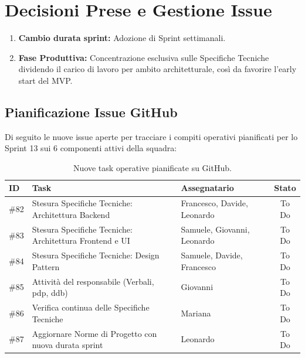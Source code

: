 \documentclass[a4paper, 11pt, oneside]{scrartcl} %
\begin{document}
\newpage
\section{Decisioni Prese e Gestione Issue}

\begin{enumerate}
    \item \textbf{Cambio durata sprint:} Adozione di Sprint settimanali.
    \item \textbf{Fase Produttiva:} Concentrazione esclusiva sulle Specifiche Tecniche dividendo il carico di lavoro per ambito architetturale, così da favorire l'early start del MVP.
\end{enumerate}

\subsection{Pianificazione Issue GitHub}
Di seguito le nuove issue aperte per tracciare i compiti operativi pianificati per lo Sprint 13 sui 6 componenti attivi della squadra:

\begin{table}[h!]
\centering
\small
\begin{tabularx}{\textwidth}{@{}l X l c@{}} 
\toprule
\textbf{ID} & \textbf{Task} & \textbf{Assegnatario} & \textbf{Stato} \\
\midrule
\#82 & Stesura Specifiche Tecniche: Architettura Backend & Francesco, Davide, Leonardo & To Do \\
\addlinespace
\#83 & Stesura Specifiche Tecniche: Architettura Frontend e UI & Samuele, Giovanni, Leonardo & To Do \\
\addlinespace
\#84 & Stesura Specifiche Tecniche: Design Pattern & Samuele, Davide, Francesco & To Do \\
\addlinespace
\#85 & Attività del responsabile (Verbali, pdp, ddb) & Giovanni & To Do \\
\addlinespace
\#86 & Verifica continua delle Specifiche Tecniche & Mariana & To Do \\
\addlinespace
\#87 & Aggiornare Norme di Progetto con nuova durata sprint & Leonardo & To Do \\
\bottomrule
\end{tabularx}
\caption{Nuove task operative pianificate su GitHub.}
\end{table}

\newpage
\end{document}
